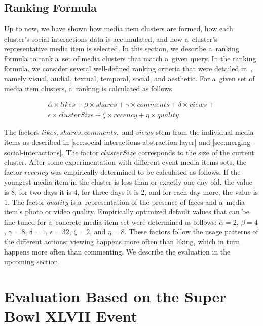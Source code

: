 \subsection{Ranking Formula}
\label{sec:introduction-of-a-ranking-formula}

Up to now, we have shown how media item clusters are formed,
how each cluster's social interactions data is accumulated,
and how a~cluster's representative media item is selected.
In this section, we describe a~ranking formula to rank
a~set of media clusters that match a~given query.
In the ranking formula, we consider several well-defined ranking criteria
that were detailed in~\cite{steiner2012definingaesthetic},
namely visual, audial, textual, temporal, social, and aesthetic.
For a~given set of media item clusters, a~ranking is calculated as follows.

\begin{gather}
  \alpha \times \mathit{likes} + \beta \times \mathit{shares} +
  \gamma \times \mathit{comments} + \delta \times \mathit{views} + \nonumber\\
  \epsilon \times \mathit{clusterSize} + \zeta \times \mathit{recency} +
  \eta \times \mathit{quality}
\end{gather}

The factors $ \mathit{likes}, \mathit{shares}, \mathit{comments},$ and $ \mathit{views} $
stem from the individual media items as described in \autoref{sec:social-interactions-abstraction-layer}
and \autoref{sec:merging-social-interactions}.
The factor $ \mathit{clusterSize} $ corresponds to the size of the current cluster. 
After some experimentation with different event media items sets,
the factor $ \mathit{recency} $ was empirically determined to be calculated as follows.
If the youngest media item in the cluster is less than or exactly one day old,
the value is 8, for two days it is 4, for three days it is 2,
and for each day more, the value is 1.
The factor $ \mathit{quality} $ is a~representation of the
presence of faces and a~media item's photo or video quality.
Empirically optimized default values
that can be fine-tuned for a~concrete media item set
were determined as follows:
$ \alpha = 2 $, $ \beta = 4 $ , $ \gamma = 8 $, $ \delta = 1 $,
$ \epsilon = 32 $, $ \zeta = 2 $, and $ \eta = 8 $.
These factors follow the usage patterns of the different actions:
viewing happens more often than liking, which in turn happens more often than commenting.
We describe the evaluation in the upcoming section.

\section{Evaluation Based on the Super Bowl XLVII Event}
\label{sec-chapter7-evaluation}

